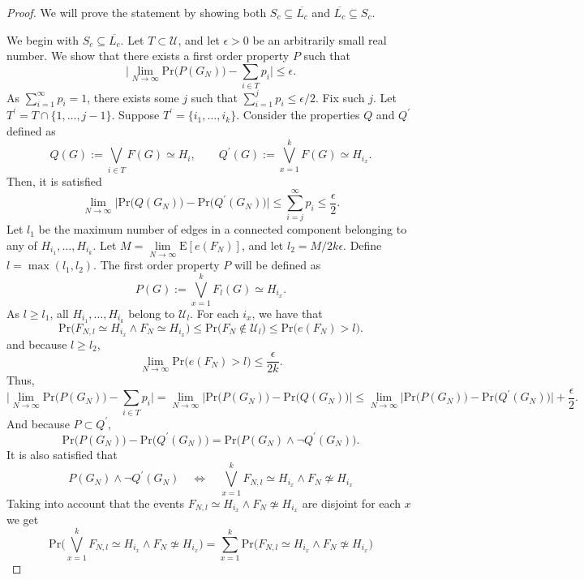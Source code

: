 \documentclass[11pt,notitlepage,a4paper]{article}
\theoremstyle{definition}
\newcommand{\LN}{\lim\limits_{N\to \infty}}
\begin{document}
\begin{proof}
	We will prove the statement by showing both 
	$S_c\subseteq \overline{L_c}$ and
	$\overline{L_c}\subseteq S_c$. \par 
	We begin with 
	$S_c\subseteq \overline{L_c}$. 
	Let $T\subset \mathcal{U}$, and let $\epsilon>0$ be
	an arbitrarily small real number. We show that 
	there exists a first order property $P$ such that
	\[ \Big| \LN \mathrm{Pr}\big( P(G_N)\big) 
	- \sum_{i\in T} p_i \Big| \leq \epsilon. \]
	As $\sum_{i=1}^{\infty} p_i=1$, there exists some $j$ such that
	$\sum_{i=1}^j p_i \leq \epsilon/2$. Fix such $j$. Let
	$T^\prime= T \cap \{ 1,\dots,j-1\}$. Suppose
	$T^\prime=\{i_1,\dots,i_k\}$. 
	Consider the properties $Q$ and $Q^\prime$ defined as
	\[
	Q(G):= \bigvee_{i\in T} F(G)\simeq H_i,  \qquad
	Q^\prime(G):= \bigvee_{x=1}^k F(G)\simeq H_{i_x}.
	\]
	Then, it is satisfied  
	\[
	\LN \Big| \mathrm{Pr}\big( Q(G_N) \big)
	- \mathrm{Pr}\big( Q^\prime(G_N) 
	\big)\Big| \leq \sum_{i=j}^\infty p_i \leq \frac{\epsilon}{2}.
	\]
	Let $l_1$ be 
	the maximum number of edges in a connected component belonging
	to any of $H_{i_1},\dots,H_{i_k}$. Let 
	$M=\LN \mathrm{E}[e(F_N)]$, and let $l_2=M/2k\epsilon$.
	Define $l=\max(l_1,l_2)$. 
	The first order property $P$ will be defined as 
	\[
	P(G):=\bigvee_{x=1}^k F_l(G)\simeq H_{i_x}.
	\]
	As $l\geq l_1$, all
	$H_{i_1},\dots, H_{i_k}$ belong to $\mathcal{U}_l$.
	For each $i_x$, we have that
	\[ \mathrm{Pr}\big(F_{N,l}\simeq H_{i_x} \wedge 
	F_N\simeq H_{i_x} \big)\leq
	\mathrm{Pr}\big(F_N\notin \mathcal{U}_l\big) \leq 
	\mathrm{Pr}\big(e(F_N)>l\big).
	\]
	and because $l\geq l_2$,
	\[
	\LN \mathrm{Pr}\big(e(F_N)>l\big)
	\leq \frac{\epsilon}{2k}.
	\]
	Thus,
	\[
	\big|\LN \mathrm{Pr}\big(P(G_N)\big)- \sum_{i\in T}p_i \big|
	= \LN \big|\mathrm{Pr}\big(P(G_N)\big) -
	\mathrm{Pr}\big(Q(G_N)\big)\big|	\leq
	\LN	\big| \mathrm{Pr}\big(P(G_N)\big) -
	\mathrm{Pr}\big(Q^\prime(G_N)\big)\big|
	+ \frac{\epsilon}{2}.
	\]
	And because $P\subset Q^\prime$, 
	\[
	\mathrm{Pr}\big(P(G_N)\big) -
	\mathrm{Pr}\big(Q^\prime(G_N)\big)
	=
	\mathrm{Pr}\big(P(G_N) \wedge \neg Q^\prime(G_N) \big).
	\]
	It is also satisfied that
	\[
	P(G_N) \wedge \neg Q^\prime(G_N) \quad \iff \quad 
	\bigvee_{x=1}^k F_{N,l}\simeq H_{i_x} \wedge 
	F_N\not\simeq H_{i_x} 
	\]
	Taking into account that the events 
	$F_{N,l}\simeq H_{i_x} \wedge 
	F_N\not\simeq H_{i_x}$ are disjoint for each $x$
	we get
	\[
	\mathrm{Pr}\big(\bigvee_{x=1}^k F_{N,l}
	\simeq H_{i_x} \wedge 
	F_N\not\simeq H_{i_x} \big)=
	\sum_{x=1}^{k} \mathrm{Pr}\big( F_{N,l}
	\simeq H_{i_x} \wedge 
	F_N\not\simeq H_{i_x} \big)
\]
\end{proof}
\end{document}
